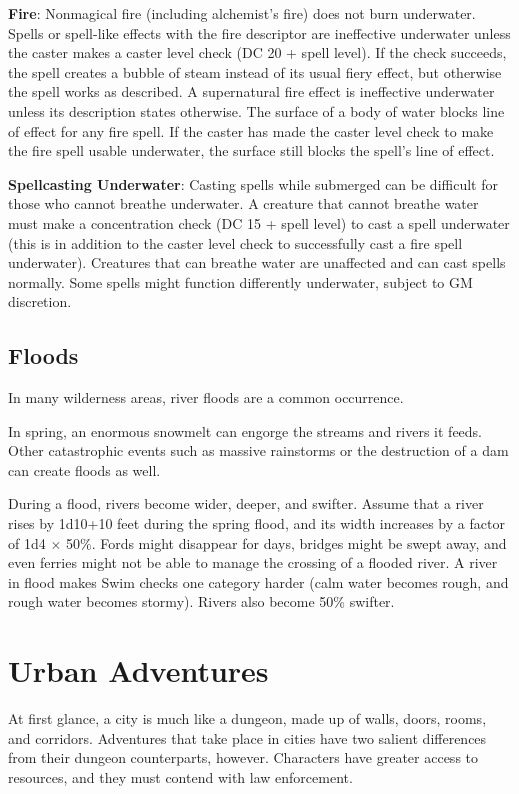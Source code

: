 \textbf{Fire}: Nonmagical fire (including alchemist's fire) does not burn underwater. Spells or spell-like effects with the fire descriptor are ineffective underwater unless the caster makes a caster level check (DC 20 + spell level). If the check succeeds, the spell creates a bubble of steam instead of its usual fiery effect, but otherwise the spell works as described. A supernatural fire effect is ineffective underwater unless its description states otherwise. The surface of a body of water blocks line of effect for any fire spell. If the caster has made the caster level check to make the fire spell usable underwater, the surface still blocks the spell's line of effect.
				
\textbf{Spellcasting Underwater}: Casting spells while submerged can be difficult for those who cannot breathe underwater. A creature that cannot breathe water must make a concentration check (DC 15 + spell level) to cast a spell underwater (this is in addition to the caster level check to successfully cast a fire spell underwater). Creatures that can breathe water are unaffected and can cast spells normally. Some spells might function differently underwater, subject to GM discretion.
				
\subsection{Floods}

				
In many wilderness areas, river floods are a common occurrence.
				
In spring, an enormous snowmelt can engorge the streams and rivers it feeds. Other catastrophic events such as massive rainstorms or the destruction of a dam can create floods as well.
				
During a flood, rivers become wider, deeper, and swifter. Assume that a river rises by 1d10+10 feet during the spring flood, and its width increases by a factor of 1d4 \mbox{$\times$} 50\%. Fords might disappear for days, bridges might be swept away, and even ferries might not be able to manage the crossing of a flooded river. A river in flood makes Swim checks one category harder (calm water becomes rough, and rough water becomes stormy). Rivers also become 50\% swifter.
				
\section{Urban Adventures}

				
At first glance, a city is much like a dungeon, made up of walls, doors, rooms, and corridors. Adventures that take place in cities have two salient differences from their dungeon counterparts, however. Characters have greater access to resources, and they must contend with law enforcement.
				
